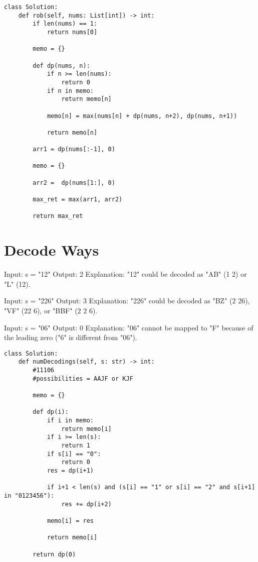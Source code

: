 \documentclass[24pt, a4]{article}
\begin{document}
\begin{lstlisting}
class Solution:
    def rob(self, nums: List[int]) -> int:
        if len(nums) == 1:
            return nums[0]
        
        memo = {}
        
        def dp(nums, n):
            if n >= len(nums):
                return 0
            if n in memo:
                return memo[n]
            
            memo[n] = max(nums[n] + dp(nums, n+2), dp(nums, n+1))
            
            return memo[n]
        
        arr1 = dp(nums[:-1], 0)
        
        memo = {}
        
        arr2 =  dp(nums[1:], 0)
        
        max_ret = max(arr1, arr2)
        
        return max_ret
\end{lstlisting}

\section{Decode Ways}

Input: s = "12"
Output: 2
Explanation: "12" could be decoded as "AB" (1 2) or "L" (12).

Input: s = "226"
Output: 3
Explanation: "226" could be decoded as "BZ" (2 26), "VF" (22 6), or "BBF" (2 2 6).

Input: s = "06"
Output: 0
Explanation: "06" cannot be mapped to "F" because of the leading zero ("6" is different from "06").

\begin{lstlisting}
class Solution:
    def numDecodings(self, s: str) -> int:
        #11106
        #possibilities = AAJF or KJF
        
        memo = {}
        
        def dp(i):
            if i in memo:
                return memo[i]
            if i >= len(s):
                return 1
            if s[i] == "0":
                return 0
            res = dp(i+1)

            if i+1 < len(s) and (s[i] == "1" or s[i] == "2" and s[i+1] in "0123456"):
                res += dp(i+2)
                
            memo[i] = res
            
            return memo[i]
        
        return dp(0)
\end{lstlisting}
\end{document}
